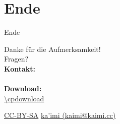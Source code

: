 \section*{Ende}

\begin{frame}{Ende}
  \begin{centering}
    Danke für die Aufmerksamkeit!\\[0.2cm]
    Fragen?\\[0.5cm]

    \textbf{Kontakt:}\\
    \cpkontakt\\[0.5cm]

    \textbf{Download:}\\
    {\footnotesize \url{\cpdownload}}\\[0.5cm]
  \end{centering}

  {\hfill \tiny \href{https://creativecommons.org/licenses/by-sa/3.0/}{CC-BY-SA}
  \href{mailto:kaimi@kaimi.cc}{ka’imi (kaimi@kaimi.cc)}}

\end{frame}
